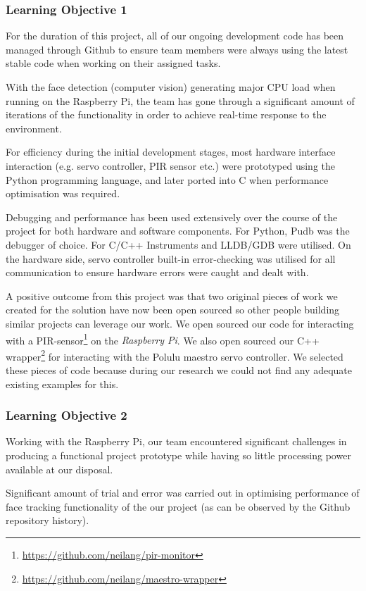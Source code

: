 \documentclass[11pt,a4paper,titlepage]{report}
\newcommand{\rpi}{\textit{Raspberry Pi\textsuperscript{\textregistered}}}
\begin{document}
\subsubsection{Learning Objective 1}
For the duration of this project, all of our ongoing development code has been managed through Github to ensure team members were always using the latest stable code when working on their assigned tasks.

With the face detection (computer vision) generating major CPU load when running on the Raspberry Pi, the team has gone through a significant amount of iterations of the functionality in order to achieve real-time response to the environment.


For efficiency during the initial development stages, most hardware interface interaction (e.g. servo controller, PIR sensor etc.) were prototyped using the Python programming language, and later ported into C when performance optimisation was required.


Debugging and performance has been used extensively over the course of the project for both hardware and software components. For Python, Pudb was the debugger of choice. For C/C++ Instruments and LLDB/GDB were utilised. On the hardware side, servo controller built-in error-checking was utilised for all communication to ensure hardware errors were caught and dealt with.

A positive outcome from this project was that two original pieces of work we created for the solution have now been open sourced so other people building similar projects can leverage our work. We open sourced our code for interacting with a PIR-sensor\footnote{\url{https://github.com/neilang/pir-monitor}} on the \rpi. We also open sourced our C++ wrapper\footnote{\url{https://github.com/neilang/maestro-wrapper}} for interacting with the Polulu maestro servo controller. We selected these pieces of code because during our research we could not find any adequate existing examples for this.



 
\subsubsection{Learning Objective 2}

Working with the Raspberry Pi, our team encountered significant challenges in producing a functional project prototype while having so little processing power available at our disposal.

Significant amount of trial and error was carried out in optimising performance of face tracking functionality of the our project (as can be observed by the Github repository history). 
\end{document}
